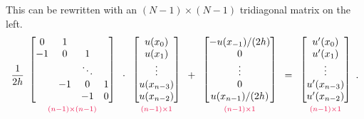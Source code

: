 \noindent This can be rewritten with an $(N-1)\times(N-1)$ tridiagonal matrix on the left.
\begin{align}
\frac{1}{2h}
\begin{array}{c}
\begin{bmatrix}
0 & 1 & \\
-1 & 0 & 1  \\
& &\ddots & \\
 & -1 & 0 & 1 \\
 & & -1 & 0
\end{bmatrix}\\
{\scriptstyle\textcolor{red}{(n-1)\times(n-1)}}
\end{array}\cdot
\begin{array}{c}
\begin{bmatrix}
u(x_0) \\ u(x_1)\\ \vdots  \\ u(x_{n-3}) \\ u(x_{n-2})
\end{bmatrix}\\
{\scriptstyle\textcolor{red}{(n-1)\times1}}
\end{array} +
\begin{array}{c}
\begin{bmatrix}
-u(x_{-1})/(2h) \\ 0 \\ \vdots  \\ 0 \\ u(x_{n-1})/(2h)
\end{bmatrix}\\
{\scriptstyle\textcolor{red}{(n-1)\times1}}
\end{array} =
\begin{array}{c}
\begin{bmatrix}
u'(x_0) \\ u'(x_1)\\ \vdots  \\ u'(x_{n-3}) \\ u'(x_{n-2})
\end{bmatrix}\\
{\scriptstyle\textcolor{red}{(n-1)\times1}}
\end{array}.
\label{finitedifference2:u}
\end{align}

